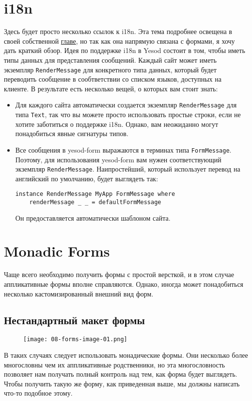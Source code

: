 \section{i18n}
Здесь будет просто несколько ссылок к i18n. Эта тема подробнее освещена в своей
собственной  \hyperref[chap:i18n]{главе},
но так как она напрямую связана с формами, я хочу дать краткий обзор. 
Идея по поддержке i18n в Yesod состоит в том, чтобы иметь типы данных для представления
сообщений. Каждый сайт может иметь экземпляр \lstinline'RenderMessage' для конкретного
типа данных, который будет переводить сообщение в сообтветствии со списком языков,
доступных на клиенте. В результате есть несколько вещей, о которых вам стоит знать:
\begin{itemize}
\item  Для каждого сайта автоматически создается экземпляр \lstinline'RenderMessage' для
типа \lstinline'Text', так что вы можете просто использовать простые строки, если не
хотите заботиться о поддержке i18n. Однако, вам неожиданно могут понадобиться явные
сигнатуры типов.
\item Все сообщения в yesod-form выражаются в терминах типа \lstinline'FormMessage'.
Поэтому, для использования yesod-form вам нужен соответствующий экземпляр 
\lstinline'RenderMessage'. Наипростейший, который использует перевод на английский по
умолчанию, будет выглядеть так:
\begin{lstlisting}
instance RenderMessage MyApp FormMessage where
    renderMessage _ _ = defaultFormMessage
\end{lstlisting}
Он предоставляется автоматически шаблоном сайта.
\end{itemize}

\section{Monadic Forms}
Чаще всего необходимо получить формы с простой версткой, и в этом случае аппликативные формы 
вполне справляются. Однако, иногда может понадобиться несколько кастомизированный 
внешний вид форм.

\subsection{Нестандартный макет формы}
\begin{figure}[tbph]
  \centering
  \caption{}
  \texttt{[image: 08-forms-image-01.png]}
\end{figure}
В таких случаях следует использовать монадические формы. Они несколько более 
многословны чем их аппликативные родственники, но эта многословность позволяет нам
получать полный контроль над тем, как форма будет выглядеть. Чтобы получить такую же
форму, как приведенная выше, мы должны написать что-то подобное этому.

